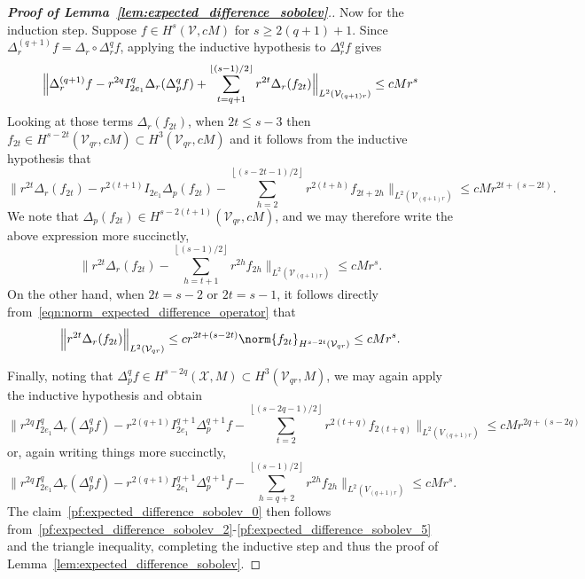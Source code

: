 \documentclass{article}
\newcommand{\floor}[1]{\left\lfloor #1 \right\rfloor}
\newcommand{\1}{\mathbf{1}}
\newcommand{\Xset}{\mathcal{X}}
\newcommand{\Vset}{\mathcal{V}}
\newcommand{\Leb}{L}
\theoremstyle{alden}
\theoremstyle{aldenthm}
\theoremstyle{definition}
\theoremstyle{remark}
\begin{document}
\begin{proof}[\textbf{Proof of Lemma~\ref{lem:expected_difference_sobolev}}.]
	Now for the induction step. Suppose $f \in H^s(\Vset,cM)$ for $s \geq 2(q + 1) + 1$. Since $\Delta_r^{(q + 1)}f = \Delta_r \circ \Delta_r^qf$, applying the inductive hypothesis to $\Delta_r^qf$ gives
	\begin{equation}
	\label{pf:expected_difference_sobolev_2}
	\Bigl\| \Delta_r^{(q + 1)}f - r^{2q}I_{2e_1}^q\Delta_r(\Delta_p^qf) + \sum_{t = q + 1}^{\floor{(s - 1)/2}}r^{2t} \Delta_r(f_{2t}) \Bigr\|_{\Leb^2(\Vset_{(q + 1)r})} \leq c M r^s
	\end{equation}
	Looking at those terms $\Delta_r(f_{2t})$, when $2t \leq s  - 3$ then $f_{2t} \in H^{s - 2t}(\Vset_{qr},cM) \subset H^3(\Vset_{qr},cM)$ and it follows from the inductive hypothesis that
	\begin{equation*}
	\biggl\| r^{2t}\Delta_r(f_{2t}) - r^{2(t + 1)}I_{2e_1}\Delta_p(f_{2t}) - \sum_{h = 2}^{\floor{(s - 2t - 1)/2}}r^{2(t + h)}f_{2t + 2h}\biggr\|_{\Leb^2(\Vset_{(q + 1)r})} \leq c M r^{2t + (s  - 2t)}.
	\end{equation*}
	We note that $\Delta_p(f_{2t}) \in H^{s - 2(t + 1)}(\Vset_{qr},cM)$, and we may therefore write the above expression more succinctly,
	\begin{equation}
	\label{pf:expected_difference_sobolev_3}
	\biggl\| r^{2t}\Delta_r(f_{2t}) - \sum_{h = t + 1}^{\floor{(s - 1)/2}}r^{2h}f_{2h}\biggr\|_{\Leb^2(\Vset_{(q + 1)r})} \leq c M r^{s}.
	\end{equation}
	On the other hand, when $2t = s - 2$ or $2t = s - 1$, it follows directly  from~\eqref{eqn:norm_expected_difference_operator} that
	\begin{equation}
	\label{pf:expected_difference_sobolev_4}
	\Bigl\|r^{2t}\Delta_r(f_{2t})\Bigr\|_{\Leb^2(\Vset_{qr})} \leq c  r^{2t + (s - 2t)} \norm{f_{2t}}_{H^{s - 2t}(\Vset_{qr})} \leq c M r^{s}.
	\end{equation}
	
	Finally, noting that $\Delta_p^qf \in H^{s - 2q}(\Xset,M) \subset H^3(\Vset_{qr},M)$, we may again apply the inductive hypothesis and obtain
	\begin{equation*}
	\biggl\| r^{2q} I_{2e_1}^q \Delta_r(\Delta_p^qf) - r^{2(q + 1)} I_{2e_1}^{q + 1} \Delta_p^{q + 1}f - \sum_{t = 2}^{\floor{(s - 2q - 1)/2}} r^{2(t + q)}f_{2(t + q)}\biggr\|_{\Leb^2(V_{(q + 1)r})} \leq c M r^{2q + (s - 2q)} 
	\end{equation*}
	or, again writing things more succinctly,
	\begin{equation}
	\label{pf:expected_difference_sobolev_5}
	\biggl\| r^{2q} I_{2e_1}^q \Delta_r(\Delta_p^qf) - r^{2(q + 1)} I_{2e_1}^{q + 1} \Delta_p^{q + 1}f - \sum_{h = q + 2}^{\floor{(s - 1)/2}} r^{2h}f_{2h}\biggr\|_{\Leb^2(V_{(q + 1)r})} \leq c M r^{s}.
	\end{equation}
	The claim~\eqref{pf:expected_difference_sobolev_0} then follows from~\eqref{pf:expected_difference_sobolev_2}-\eqref{pf:expected_difference_sobolev_5} and the triangle inequality, completing the inductive step and thus the proof of Lemma~\ref{lem:expected_difference_sobolev}.
\end{proof}
\end{document}
